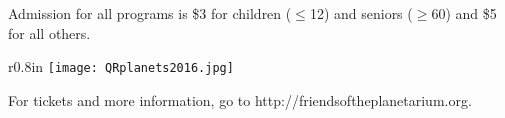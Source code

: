 \documentclass{article}
\begin{document}
   {\fontsize{16}{18}

Admission for all programs is \$3 for children ($\le$12) and seniors ($\ge$60) and \$5 for all others.

   }



   {\fontsize{18}{24}

\begin{wrapfigure}{r}{0.8in}
   \texttt{[image: QRplanets2016.jpg]}
\end{wrapfigure}      

\begin{centering}
  
For tickets and more information, go to\break
http://friendsoftheplanetarium.org.

\end{centering}

}



\end{document}
